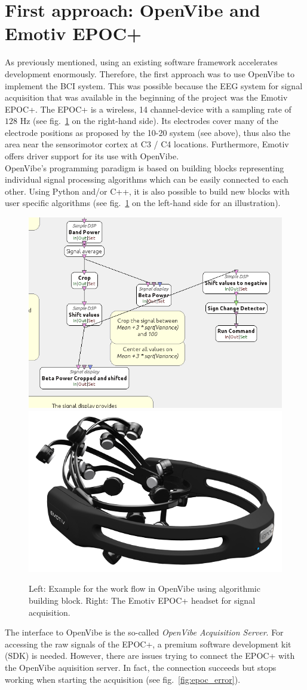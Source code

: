 \documentclass[a4paper,oneside, openright,12pt]{report}
\begin{document}
\section{First approach: OpenVibe and Emotiv EPOC+}
As previously mentioned, using an existing software framework accelerates development enormously. Therefore, the first approach was to use OpenVibe to implement the BCI system. This was possible because the EEG system for signal acquisition that was available in the beginning of the project was the Emotiv EPOC+. The EPOC+ is a wireless, 14 channel-device with a sampling rate of $128$ Hz (see fig.~\ref*{fig:openvibe_blocks} on the right-hand side). Its electrodes cover many of the electrode positions as proposed by the 10-20 system (see above), thus also the area near the sensorimotor cortex at C3 / C4 locations. Furthermore, Emotiv offers driver support for its use with OpenVibe.\\
OpenVibe's programming paradigm is based on building blocks representing individual signal processing algorithms which can be easily connected to each other. Using Python and/or C++, it is also possible to build new blocks with user specific algorithms (see fig.~\ref{fig:openvibe_blocks} on the left-hand side for an illustration).
\begin{figure}[tbph!]
\centering
\includegraphics[width=0.6\linewidth]{gfx/openvibe_blocks}
\includegraphics[width=0.39\linewidth]{gfx/emotiv_epoc}
\caption{Left: Example for the work flow in OpenVibe using algorithmic building block. Right: The Emotiv EPOC+ headset for signal acquisition.}
\label{fig:openvibe_blocks}
\end{figure}
The interface to OpenVibe is the so-called \textit{OpenVibe Acquisition Server}. For accessing the raw signals of the EPOC+, a premium software development kit (SDK) is needed. However, there are issues trying to connect the EPOC+ with the OpenVibe aquisition server. In fact, the connection succeeds but stops working when starting the acquisition (see fig.~\ref{fig:epoc_error}).
 
\end{document}
